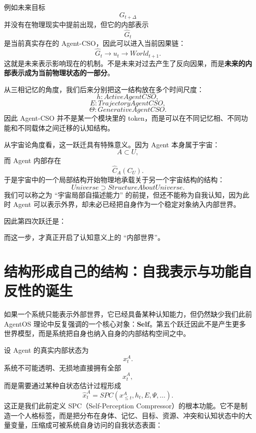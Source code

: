例如未来目标
\[
G_{t+\Delta}
\]
并没有在物理现实中提前出现，但它的内部表示
\[
\hat G_t
\]
是当前真实存在的 Agent-CSO，因此可以进入当前因果链：
\[
\hat G_t
\rightarrow
u_t
\rightarrow
World_{t+1}.
\]
这就是未来表示影响现在的机制。不是未来对过去产生了反向因果，而是\textbf{未来的内部表示成为当前物理状态的一部分}。

从三相记忆的角度，我们后来分别把这一结构放在多个时间尺度：
\[
h:
ActiveAgentCSO,
\]
\[
E:
TrajectoryAgentCSO,
\]
\[
\Theta:
GenerativeAgentCSO.
\]
因此 Agent-CSO 并不是某一个模块里的 token，而是可以在不同记忆相、不同功能和不同载体之间迁移的认知结构。

从宇宙论角度看，这一跃迁具有特殊意义。因为 Agent 本身属于宇宙：
\[
A\subset U,
\]
而 Agent 内部存在
\[
\hat C_A(C_U).
\]
于是宇宙中的一个局部结构开始物理地承载关于另一个宇宙结构的结构：
\[
\boxed{
Universe
\supset
StructureAboutUniverse.
}
\]
我们可以称之为 ``宇宙局部自描述能力'' 的前提，但还不能称为自我认知，因为此时 Agent 可以表示外界，却未必已经把自身作为一个稳定对象纳入内部世界。

因此第四次跃迁是：
\begin{statementbox}
\centering
{}
\end{statementbox}
而这一步，才真正开启了认知意义上的 ``内部世界''。

\section{结构形成自己的结构：自我表示与功能自反性的诞生}

如果一个系统只能表示外部世界，它已经具备某种认知能力，但仍然缺少我们此前 AgentOS 理论中反复强调的一个核心对象：\textbf{Self}。第五个跃迁因此不是产生更多世界模型，而是系统把自身也纳入自身的内部结构空间之中。

设 Agent 的真实内部状态为
\[
x^A_t.
\]
系统不可能透明、无损地直接拥有全部
\[
x^A_t,
\]
而是需要通过某种自状态估计过程形成
\[
\hat x^A_t
=
SPC(x^A_{\leq t},h_t,E,\Psi,\ldots).
\]
这正是我们此前定义 SPC（Self-Perception Compressor）的根本功能。它不是制造一个人格标签，而是把分布在身体、记忆、目标、资源、冲突和认知状态中的大量变量，压缩成可被系统自身访问的自我状态表面：
\begin{statementbox}
\centering
{}
\end{statementbox}

